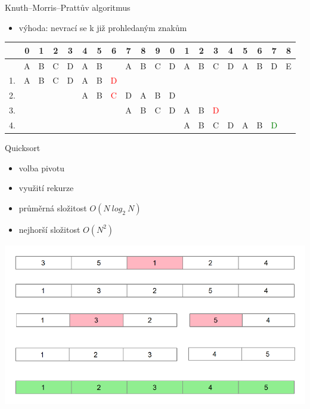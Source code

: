\documentclass{beamer}
\begin{document}
\begin{frame}{Knuth–Morris–Prattův algoritmus}
  \begin{itemize}
    \item výhoda: nevrací se k již prohledaným znakům
  \end{itemize}
  \begin{center}
  \begin{tabular}{|l|@{}c@{}|@{}c@{}|@{}c@{}|@{}c@{}|@{}c@{}|@{}c@{}|@{}c@{}|@{}c@{}|@{}c@{}|@{}c@{}|@{}c@{}|@{}c@{}|@{}c@{}|@{}c@{}|@{}c@{}|@{}c@{}|@{}c@{}|@{}c@{}|@{}c@{}|}
  \hline
     &0&1&2&3&4&5&6&7&8&9&0&1&2&3&4&5&6&7&8\\ \hline
     &A&B&C&D&A&B& &A&B&C&D&A&B&C&D&A&B&D&E\\ \hline
    1.&A&B&C&D&A&B&\textcolor{red}{D}& & & & & & & & & & & & \\ \hline
    2.& & & & &A&B&\textcolor{red}{C}&D&A&B&D& & & & & & & & \\ \hline
    3.& & & & & & & &A&B&C&D&A&B&\textcolor{red}{D}& & & & & \\ \hline
    4.& & & & & & & & & & & &A&B&C&D&A&B&\textcolor{green}{D}& \\ \hline
  \end{tabular}
  \end{center}
\end{frame}

\begin{frame}{Quicksort}
  \begin{itemize}
    \item volba pivotu
    \item využití rekurze
    \item průměrná složitost $O(N\ log_2\ N)$
    \item nejhorší složitost $O(N^2)$
  \end{itemize}
  \begin{center}
    \includegraphics[scale=0.5]{qs.pdf}
  \end{center}
\end{frame}
\end{document}
